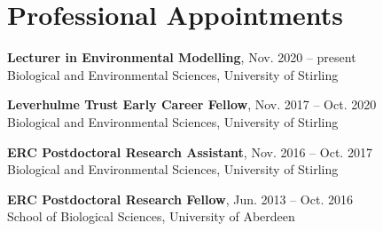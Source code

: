 \documentclass[letterpaper]{article}
\def\name{A. Bradley Duthie}
\renewenvironment{itemize}{
  \begin{list}{}{
    \setlength{\leftmargin}{1.5em}
  }
}{
  \end{list}
}
\begin{document}
\hrulefill

\vspace{0.16in}


\begin{minipage}{0.65\linewidth}
\section*{Professional Appointments}
\begin{itemize}
	\item{\bf Lecturer in Environmental Modelling}, Nov. 2020 -- present \\
	Biological and Environmental Sciences, University of Stirling
\end{itemize}
\begin{itemize}
	\item{\bf Leverhulme Trust Early Career Fellow}, Nov. 2017 -- Oct. 2020 \\
	Biological and Environmental Sciences, University of Stirling
\end{itemize}
\begin{itemize}
	\item{\bf ERC Postdoctoral Research Assistant}, Nov. 2016 -- Oct. 2017 \\
	Biological and Environmental Sciences, University of Stirling
\end{itemize}
\begin{itemize}
	\item{\bf ERC Postdoctoral Research Fellow}, Jun. 2013 -- Oct. 2016 \\
	School of Biological Sciences, University of Aberdeen
\end{itemize}


\end{minipage}
\end{document}
